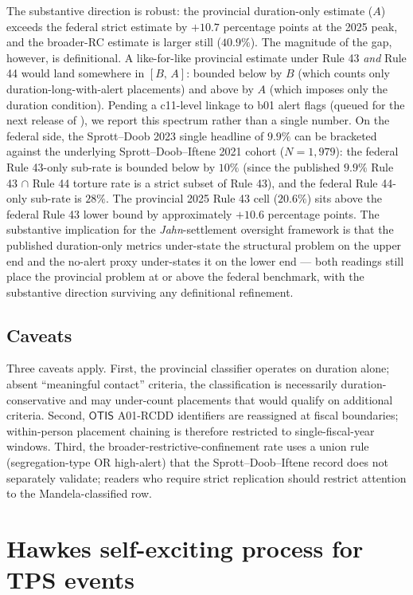 \documentclass[article,shortnames,nojss]{jss}
\newcommand{\OTIS}{\textsf{OTIS}}
\begin{document}
The substantive direction is robust: the provincial duration-only
estimate ($A$) exceeds the federal strict estimate by
$+10.7$ percentage points at the 2025 peak, and the broader-RC
estimate is larger still ($40.9\%$).  The magnitude of the gap,
however, is definitional.  A like-for-like provincial estimate
under Rule 43 \emph{and} Rule 44 would land somewhere in
$[B,\,A]$: bounded below by $B$ (which counts only
duration-long-with-alert placements) and above by $A$ (which
imposes only the duration condition).  Pending a c11-level
linkage to b01 alert flags (queued for the next release of
), we report this spectrum rather
than a single number.  On the federal side, the Sprott--Doob 2023
single headline of $9.9\%$ can be bracketed against the underlying
Sprott--Doob--Iftene 2021 cohort ($N=1{,}979$): the federal
Rule 43-only sub-rate is bounded below by $10\%$ (since the
published $9.9\%$ Rule 43 $\cap$ Rule 44 torture rate is a strict
subset of Rule 43), and the federal Rule 44-only sub-rate is
$28\%$.  The provincial 2025 Rule 43 cell ($20.6\%$) sits above
the federal Rule 43 lower bound by approximately $+10.6$
percentage points.  The substantive implication for the
\emph{Jahn}-settlement oversight framework is that the published
duration-only metrics under-state the structural problem on the
upper end and the no-alert proxy under-states it on the lower
end --- both readings still place the provincial problem at or
above the federal benchmark, with the substantive direction
surviving any definitional refinement.

\subsection{Caveats}

Three caveats apply. First, the provincial classifier operates on
duration alone; absent ``meaningful contact'' criteria, the
classification is necessarily duration-conservative and may
under-count placements that would qualify on additional criteria.
Second, $\OTIS$ A01-RCDD identifiers are reassigned at fiscal
boundaries; within-person placement chaining is therefore
restricted to single-fiscal-year windows. Third, the
broader-restrictive-confinement rate uses a union rule
(segregation-type OR high-alert) that the Sprott--Doob--Iftene
record does not separately validate; readers who require strict
replication should restrict attention to the Mandela-classified
row.

\section{Hawkes self-exciting process for TPS events}
\label{sec:hawkes}
\end{document}
